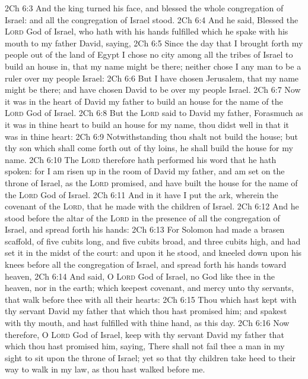 \vs 2Ch 6:3 And the king turned his face, and blessed the whole congregation of Israel: and all the congregation of Israel stood.
\vs 2Ch 6:4 And he said, Blessed  the \textsc{Lord} God of Israel, who hath with his hands fulfilled  which he spake with his mouth to my father David, saying,
\vs 2Ch 6:5 Since the day that I brought forth my people out of the land of Egypt I chose no city among all the tribes of Israel to build an house in, that my name might be there; neither chose I any man to be a ruler over my people Israel:
\vs 2Ch 6:6 But I have chosen Jerusalem, that my name might be there; and have chosen David to be over my people Israel.
\vs 2Ch 6:7 Now it was in the heart of David my father to build an house for the name of the \textsc{Lord} God of Israel.
\vs 2Ch 6:8 But the \textsc{Lord} said to David my father, Forasmuch as it was in thine heart to build an house for my name, thou didst well in that it was in thine heart:
\vs 2Ch 6:9 Notwithstanding thou shalt not build the house; but thy son which shall come forth out of thy loins, he shall build the house for my name.
\vs 2Ch 6:10 The \textsc{Lord} therefore hath performed his word that he hath spoken: for I am risen up in the room of David my father, and am set on the throne of Israel, as the \textsc{Lord} promised, and have built the house for the name of the \textsc{Lord} God of Israel.
\vs 2Ch 6:11 And in it have I put the ark, wherein  the covenant of the \textsc{Lord}, that he made with the children of Israel.
\vs 2Ch 6:12 And he stood before the altar of the \textsc{Lord} in the presence of all the congregation of Israel, and spread forth his hands:
\vs 2Ch 6:13 For Solomon had made a brasen scaffold, of five cubits long, and five cubits broad, and three cubits high, and had set it in the midst of the court: and upon it he stood, and kneeled down upon his knees before all the congregation of Israel, and spread forth his hands toward heaven,
\vs 2Ch 6:14 And said, O \textsc{Lord} God of Israel,  no God like thee in the heaven, nor in the earth; which keepest covenant, and  mercy unto thy servants, that walk before thee with all their hearts:
\vs 2Ch 6:15 Thou which hast kept with thy servant David my father that which thou hast promised him; and spakest with thy mouth, and hast fulfilled  with thine hand, as  this day.
\vs 2Ch 6:16 Now therefore, O \textsc{Lord} God of Israel, keep with thy servant David my father that which thou hast promised him, saying, There shall not fail thee a man in my sight to sit upon the throne of Israel; yet so that thy children take heed to their way to walk in my law, as thou hast walked before me.
